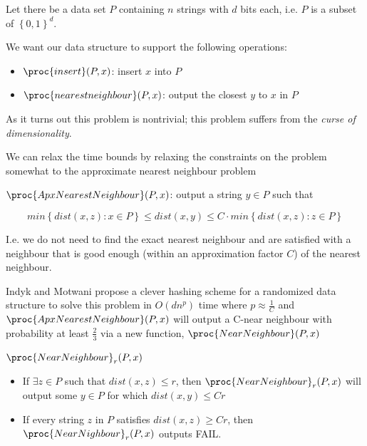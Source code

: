 \documentclass[../notes.tex]{subfiles}
\begin{document}
Let there be a data set $ P $ containing $ n $ strings with $ d $ bits each, i.e. $ P $ is a subset of $ \left\{ 0, 1 \right\} ^d $. 

We want our data structure to support the following operations:

\begin{itemize}
    \item $ \proc{insert}(P, x) $: insert $ x $ into $ P $
    \item $ \proc{nearestneighbour}(P, x) $: output the closest $ y $ to $ x $ in $ P $
\end{itemize}


As it turns out this problem is nontrivial; this problem suffers from the \textit{curse of dimensionality}. 

We can relax the time bounds by relaxing the constraints on the problem somewhat to the approximate nearest neighbour problem

\begin{definition}
    $ \proc{ApxNearestNeighbour}(P, x) $: output a string $ y \in P $ such that 

    \begin{equation}
        min \left\{ dist(x, z) : x \in P \right\}  \le  dist(x, y) \le  C \cdot  min \left\{ dist(x, z) : z \in P \right\} 
    \end{equation}

    I.e. we do not need to find the exact nearest neighbour and are satisfied with a neighbour that is good enough (within an approximation factor $ C $) of the nearest neighbour.

\end{definition}

Indyk and Motwani propose a clever hashing scheme for a randomized data structure to solve this problem in $ O(dn^p) $ time where $ p \approx \frac{1}{C} $ and $ \proc{ApxNearestNeighbour}(P, x) $ will output a C-near neighbour with probability at least $ \frac{2}{3} $ via a new function, $ \proc{NearNeighbour}(P, x) $


\begin{definition}
    $ \proc{NearNeighbour}_r(P, x) $
    \begin{itemize}
        \item If $ \exists z \in P  $  such that $ dist(x, z) \le  r $, then $ \proc{NearNeighbour}_r(P, x) $  will output some $ y \in P $ for which $ dist(x,y) \le  Cr $
        \item If every string $ z $ in $ P $ satisfies $ dist(x, z) \ge  Cr $, then $ \proc{NearNighbour}_r(P, x) $ outputs FAIL.
    \end{itemize}
\end{definition}
\end{document}
